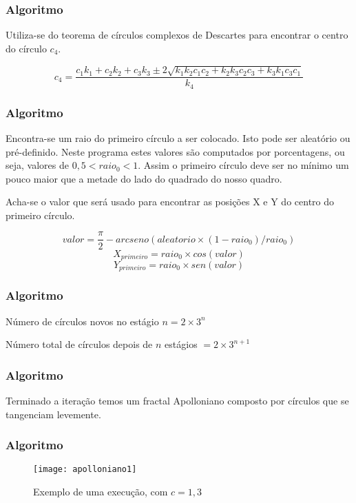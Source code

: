 \documentclass[aspectratio=169,11pt,red]{beamer}
\begin{document}
\begin{frame}
\frametitle{Algoritmo}
Utiliza-se do teorema de círculos complexos de Descartes para encontrar o centro do círculo $c_{4}$.
\medskip

\begin{equation}
c_{4} = \dfrac{c_{1}k_{1} + c_{2}k_{2} + c_{3}k_{3} \pm 2 \sqrt{k_{1}k_{2}c_{1}c_{2} + k_{2}k_{3}c_{2}c_{3} + k_{3}k_{1}c_{3}c_{1}}}{k_{4}}
\end{equation}
\end{frame}

\begin{frame}
\frametitle{Algoritmo}
Encontra-se um raio do primeiro círculo a ser colocado. Isto pode ser aleatório ou pré-definido. Neste programa estes valores são computados por porcentagens, ou seja, valores de $0,5 < raio_{0} < 1$. Assim o primeiro círculo deve ser no mínimo um pouco maior que a metade do lado do quadrado do nosso quadro.
\medskip

Acha-se o valor que será usado para encontrar as posições X e Y do centro do primeiro círculo.
\medskip

$$valor = \dfrac{\pi}{2}-arcseno(aleatorio \times (1-raio_{0})/raio_{0})$$
$$X_{primeiro} = raio_{0} \times cos(valor)$$
$$Y_{primeiro} = raio_{0} \times sen(valor)$$
\end{frame}

\begin{frame}
\frametitle{Algoritmo}
Número de círculos novos no estágio $n = 2 \times 3^{n}$
\medskip

Número total de círculos depois de $n$ estágios $= 2 \times 3^{n+1}$
\end{frame}

\begin{frame}
\frametitle{Algoritmo}
Terminado a iteração temos um fractal Apolloniano composto por círculos que se tangenciam levemente.
\end{frame}

\begin{frame}
\frametitle{Algoritmo}

\begin{figure}[h]
\caption{Exemplo de uma execução, com $c=1,3$}
\centering
\texttt{[image: apolloniano1]}
\end{figure}

\end{frame}
\end{document}
